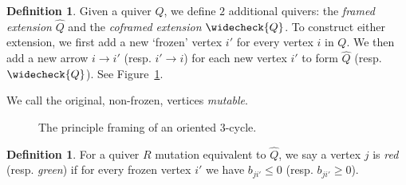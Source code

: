 \documentclass[11pt, letterpaper]{amsart}
\theoremstyle{definition}
\newtheorem{definition}[theorem]{Definition}
\numberwithin{equation}{section}
\begin{document}
\begin{definition}
Given a quiver $Q$, we define $2$ additional quivers: the \emph{framed extension} $\widehat{Q}$ and the \emph{coframed extension} $\widecheck{Q}$. 
To construct either extension, we first add a new `frozen' vertex $i'$ for every vertex $i$ in $Q$. 
We then add a new arrow $i \rightarrow i'$ (resp. $i' \rightarrow i$) for each new vertex $i'$ to form $\widehat{Q}$ (resp. $\widecheck{Q}$). See Figure~\ref{fig:3-cycle framing}.

We call the original, non-frozen, vertices \emph{mutable}.
\end{definition}

\begin{figure}[ht]
        \centering
        \vspace{-5pt}
    \caption{The principle framing of an oriented $3$-cycle.}
    \label{fig:3-cycle framing}
\end{figure}


\begin{definition}
    For a quiver $R$ mutation equivalent to $\widehat Q$, we say a vertex $j$ is \emph{red} (resp. \emph{green}) if for every frozen vertex $i'$ we have $b_{ji'} \leq 0$ (resp. $b_{ji'} \geq 0$).
\end{definition}
\end{document}
